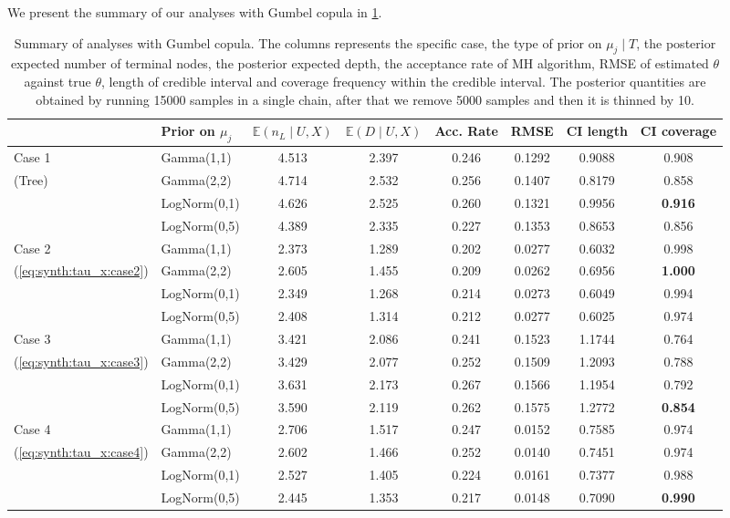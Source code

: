 \documentclass{amsart}
\begin{document}
We present the summary of our analyses with Gumbel copula in \cref{tab:gumbel:summary}. 


\begin{table}[ht]
	\centering
	\caption{Summary of analyses with Gumbel copula. The columns represents the specific case, the type of prior on $\mu_j\mid T$, the posterior expected number of terminal nodes, the posterior expected depth, the acceptance rate of MH algorithm, RMSE of estimated $\theta$ against true $\theta$, length of credible interval and coverage frequency within the credible interval. The posterior quantities are obtained by running 15000 samples in a single chain, after that we remove 5000 samples and then it is thinned by 10.}
	\label{tab:gumbel:summary}
	\scriptsize{
	\begin{tabular}{ll|cccccc}
		\toprule
		& Prior on $\mu_j$ & $\mathbb{E}(n_L\mid U,X)$ & $\mathbb{E}(D\mid U,X)$ & Acc. Rate & RMSE & CI length & CI coverage \\ 
		\midrule
		Case 1 & Gamma(1,1) & 4.513 & 2.397 & 0.246 & 0.1292 & 0.9088 & 0.908 \\ 
		(Tree) & Gamma(2,2) & 4.714 & 2.532 & 0.256 & 0.1407 & 0.8179 & 0.858 \\ 
		& LogNorm(0,1) & 4.626 & 2.525 & 0.260 & 0.1321 & 0.9956 & \textbf{0.916} \\ 
		& LogNorm(0,5) & 4.389 & 2.335 & 0.227 & 0.1353 & 0.8653 & 0.856 \\ 
		\midrule
		Case 2 & Gamma(1,1) & 2.373 & 1.289 & 0.202 & 0.0277 & 0.6032 & 0.998 \\ 
		(\cref{eq:synth:tau_x:case2}) & Gamma(2,2) & 2.605 & 1.455 & 0.209 & 0.0262 & 0.6956 & \textbf{1.000} \\ 
		& LogNorm(0,1) & 2.349 & 1.268 & 0.214 & 0.0273 & 0.6049 & 0.994 \\ 
		& LogNorm(0,5) & 2.408 & 1.314 & 0.212 & 0.0277 & 0.6025 & 0.974 \\ 
		\midrule
		Case 3 & Gamma(1,1) & 3.421 & 2.086 & 0.241 & 0.1523 & 1.1744 & 0.764 \\ 
		(\cref{eq:synth:tau_x:case3}) & Gamma(2,2) & 3.429 & 2.077 & 0.252 & 0.1509 & 1.2093 & 0.788 \\ 
		& LogNorm(0,1) & 3.631 & 2.173 & 0.267 & 0.1566 & 1.1954 & 0.792 \\ 
		& LogNorm(0,5) & 3.590 & 2.119 & 0.262 & 0.1575 & 1.2772 & \textbf{0.854} \\ 
		\midrule
		Case 4 & Gamma(1,1) & 2.706 & 1.517 & 0.247 & 0.0152 & 0.7585 & 0.974 \\ 
		(\cref{eq:synth:tau_x:case4}) & Gamma(2,2) & 2.602 & 1.466 & 0.252 & 0.0140 & 0.7451 & 0.974 \\ 
		& LogNorm(0,1) & 2.527 & 1.405 & 0.224 & 0.0161 & 0.7377 & 0.988 \\ 
		& LogNorm(0,5) & 2.445 & 1.353 & 0.217 & 0.0148 & 0.7090 & \textbf{0.990} \\ 
		\end{tabular}}
\end{table}
\end{document}
